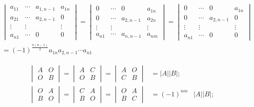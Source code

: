\documentclass[lang=cn,10pt]{elegantbook}
\begin{document}
\begin{theorem}[副对角线三角行列式] \label{thm:fdjxhls} 
\begin{equation}
   \label{eq:fdjxhls}
   \begin{aligned}
    \begin{vmatrix}
       a_{11}&\cdots&a_{1,n-1}&a_{1n}\\
       a_{21}&\cdots&a_{2,n-1}&0\\
       \vdots&\vdots& &\vdots\\
       a_{n1}&\cdots&0&0
   \end{vmatrix}=
   \begin{vmatrix}
       0&\cdots&0&a_{1n}\\
       0&\cdots&a_{2,n-1}&a_{2n}\\
       \vdots&\vdots& &\vdots\\
       a_{n1}&\cdots&a_{n,n-1}&a_{nm}
   \end{vmatrix}=
   \begin{vmatrix}
       0&\cdots&0&a_{1n}\\
       0&\cdots&a_{2,n-1}&0\\
       \vdots&\vdots& &\vdots\\
       a_{n1}&\cdots&0&0
   \end{vmatrix}&\\
   = (-1)^{\frac{n(n-1)}{2}} a_{1n}a_{2,n-1}\cdots a_{n1}
   \end{aligned}
\end{equation}
\end{theorem}

\begin{theorem} \label{thm:lplszks} 
\begin{equation}
   \label{eq:lplszks}
   \begin{aligned}
   \begin{vmatrix}
       A&O\\O&B
   \end{vmatrix}=
   \begin{vmatrix}
       A&C\\O&B
   \end{vmatrix}=
   \begin{vmatrix}
        A&O\\C&B
   \end{vmatrix} &=\vert A \vert \vert B \vert;\\
   \begin{vmatrix}
       O&A\\B&O
   \end{vmatrix}=
   \begin{vmatrix}
       C&A\\B&O
   \end{vmatrix}=
   \begin{vmatrix}
        O&A\\B&C
   \end{vmatrix}&= (-1)^{nm}& \vert A \vert \vert B \vert;
   \end{aligned}
\end{equation}
\end{theorem}
\end{document}
